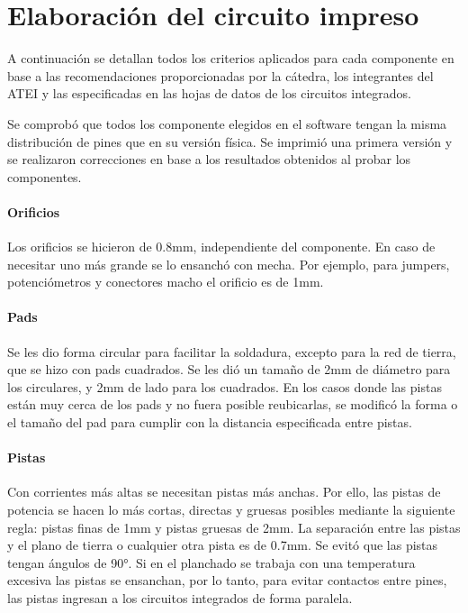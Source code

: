 \section{Elaboración del circuito impreso}

A continuación se detallan todos los criterios aplicados para cada componente en base a las recomendaciones 
proporcionadas por la cátedra, los integrantes del ATEI y las especificadas en las hojas de datos de los circuitos integrados.

Se comprobó que todos los componente elegidos en el software tengan la misma distribución de pines que en su versión física. 
Se imprimió una primera versión y se realizaron correcciones en base a los resultados obtenidos al probar los componentes. 

\paragraph{Orificios}

Los orificios se hicieron de 0.8mm, independiente del componente. En caso de necesitar uno más grande se lo ensanchó con mecha.
Por ejemplo, para jumpers, potenciómetros y conectores macho el orificio es de 1mm. 

\paragraph{Pads}

Se les dio forma circular para facilitar la soldadura, excepto para la red de tierra, que se hizo con pads cuadrados.
Se les dió un tamaño de 2mm de diámetro para los circulares, y 2mm de lado para los cuadrados.
En los casos donde las pistas están muy cerca de los pads y no fuera posible reubicarlas,
se modificó la forma o el tamaño del pad para cumplir con la distancia especificada entre pistas.  

\paragraph{Pistas}

Con corrientes más altas se necesitan pistas más anchas. 
Por ello, las pistas de potencia se hacen lo más cortas, directas y gruesas posibles mediante la siguiente regla:
pistas finas de 1mm y pistas gruesas de 2mm. 
La separación entre las pistas y el plano de tierra o cualquier otra pista es de 0.7mm. 
Se evitó que las pistas tengan ángulos de 90°. 
Si en el planchado se trabaja con una temperatura excesiva las pistas se ensanchan, por lo tanto,
para evitar contactos entre pines, las pistas ingresan a los circuitos integrados de forma paralela. 

